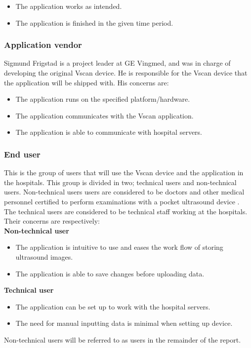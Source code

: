 \begin{itemize}
\item The application works as intended.
\item The application is finished in the given time period.
\end{itemize}

\subsubsection{Application vendor}
Sigmund Frigstad is a project leader at GE Vingmed, and was in charge of developing the original Vscan device. He is responsible for the Vscan device that the application will be shipped with. His concerns are: 

\begin{itemize}
\item The application runs on the specified platform/hardware.
\item The application communicates with the Vscan application.
\item The application is able to communicate with hospital servers.
\end{itemize}

\subsubsection{End user}
This is the group of users that will use the Vscan device and the application in the hospitals. This group is divided in two; technical users and non-technical users. Non-technical users users are considered to be doctors and other medical personnel certified to perform examinations with a pocket ultrasound device \cite{EFSUMB}. The technical users are considered to be technical staff working at the hospitals. Their concerns are respectively:\\

\textbf{Non-technical user}
\begin{itemize}
\item The application is intuitive to use and eases the work flow of storing ultrasound images.
\item The application is able to save changes before uploading data.
\end{itemize}

\textbf{Technical user}
\begin{itemize}
\item The application can be set up to work with the hospital servers.
\item The need for manual inputting data is minimal when setting up device.
\end{itemize}
\noindent Non-technical users will be referred to as users in the remainder of the report.



